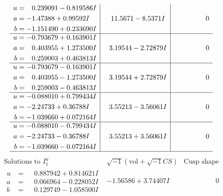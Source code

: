 \documentclass[1p]{elsarticle_modified}
\theoremstyle{definition}
\newcommand{\I}{\sqrt{-1}}
\begin{document}
$$\begin{array}{c|c|c}
\begin{aligned}
u &= \phantom{-}0.239091 - 0.819586 I \\
a &= -1.47388 + 0.99592 I \\
b &= -1.151490 + 0.233690 I\end{aligned}
 & \phantom{-}11.5671 - 8.5371 I & \phantom{-0.000000 } 0 \\ \hline\begin{aligned}
u &= -0.793679 + 0.163901 I \\
a &= \phantom{-}0.403955 + 1.273500 I \\
b &= \phantom{-}0.259003 + 0.463813 I\end{aligned}
 & \phantom{-}3.19544 - 2.72879 I & \phantom{-0.000000 } 0 \\ \hline\begin{aligned}
u &= -0.793679 - 0.163901 I \\
a &= \phantom{-}0.403955 - 1.273500 I \\
b &= \phantom{-}0.259003 - 0.463813 I\end{aligned}
 & \phantom{-}3.19544 + 2.72879 I & \phantom{-0.000000 } 0 \\ \hline\begin{aligned}
u &= -0.088010 + 0.799434 I \\
a &= -2.24733 + 0.36788 I \\
b &= -1.039660 + 0.072164 I\end{aligned}
 & \phantom{-}3.55213 - 3.56061 I & \phantom{-0.000000 } 0 \\ \hline\begin{aligned}
u &= -0.088010 - 0.799434 I \\
a &= -2.24733 - 0.36788 I \\
b &= -1.039660 - 0.072164 I\end{aligned}
 & \phantom{-}3.55213 + 3.56061 I & \phantom{-0.000000 } 0\\
 \hline 
 \end{array}$$\newpage$$\begin{array}{c|c|c}  
\text{Solutions to }I^u_{1}& \I (\text{vol} + \sqrt{-1}CS) & \text{Cusp shape}\\
 \hline 
\begin{aligned}
u &= \phantom{-}0.887942 + 0.814621 I \\
a &= \phantom{-}0.066964 - 0.228052 I \\
b &= \phantom{-}0.129749 - 1.058500 I\end{aligned}
 & -1.56586 + 3.74407 I & \phantom{-0.000000 } 0 \\ \hline\begin{aligned}

\end{aligned}
\end{array}$$
\end{document}

